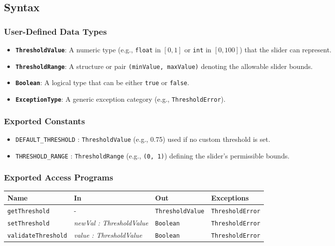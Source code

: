 \documentclass[12pt, titlepage]{article}
\begin{document}
\subsection{Syntax}

\subsubsection{User-Defined Data Types}

\begin{itemize}
    \item \textbf{\texttt{ThresholdValue}}: A numeric type (e.g., \texttt{float} in $[0,1]$ or \texttt{int} in $[0,100]$) that the slider can represent.
    \item \textbf{\texttt{ThresholdRange}}: A structure or pair \texttt{(minValue, maxValue)} denoting the allowable slider bounds.
    \item \textbf{\texttt{Boolean}}: A logical type that can be either \texttt{true} or \texttt{false}.
    \item \textbf{\texttt{ExceptionType}}: A generic exception category (e.g., \texttt{ThresholdError}).
\end{itemize}

\subsubsection{Exported Constants}

\begin{itemize}
    \item \texttt{DEFAULT\_THRESHOLD} : \texttt{ThresholdValue} (e.g., 0.75) used if no custom threshold is set.
    \item \texttt{THRESHOLD\_RANGE} : \texttt{ThresholdRange} (e.g., \texttt{(0, 1)}) defining the slider’s permissible bounds.
\end{itemize}

\subsubsection{Exported Access Programs}

\begin{center}
\begin{tabular}{p{3.5cm} p{3.8cm} p{3cm} p{2.5cm}}
\hline
\textbf{Name} & \textbf{In} & \textbf{Out} & \textbf{Exceptions} \\
\hline
\texttt{getThreshold} 
  & - 
  & \texttt{ThresholdValue} 
  & \texttt{ThresholdError} \\

\texttt{setThreshold} 
  & \textit{newVal : ThresholdValue}
  & \texttt{Boolean}
  & \texttt{ThresholdError} \\

\texttt{validateThreshold} 
  & \textit{value : ThresholdValue}
  & \texttt{Boolean} 
  & \texttt{ThresholdError} \\
\hline
\end{tabular}
\end{center}
\end{document}
